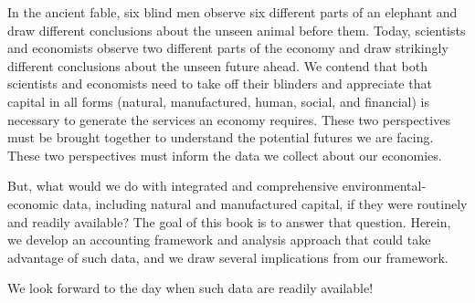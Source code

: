 % 
% 

In the ancient fable, 
six blind men observe six different parts 
of an elephant and draw different conclusions 
about the unseen animal before them.
Today, 
scientists and economists observe two different parts 
of the economy and draw strikingly different conclusions 
about the unseen future ahead. 
We contend that both scientists and economists 
need to take off their blinders and 
appreciate that capital in all forms 
(natural, manufactured, human, social, and financial)
is necessary to generate the services an economy requires. 
These two perspectives must be brought together 
to understand the potential futures we are facing. 
These two perspectives must inform the data we collect about our economies.


But, what would we do with integrated and comprehensive environmental-economic data, 
including natural and manufactured capital, 
if they were routinely and readily available? 
The goal of this book is to answer that question.
Herein, we develop an accounting framework 
and analysis approach that could take advantage of such data,
and we draw several implications from our framework.

We look forward to the day when such data are readily available!





